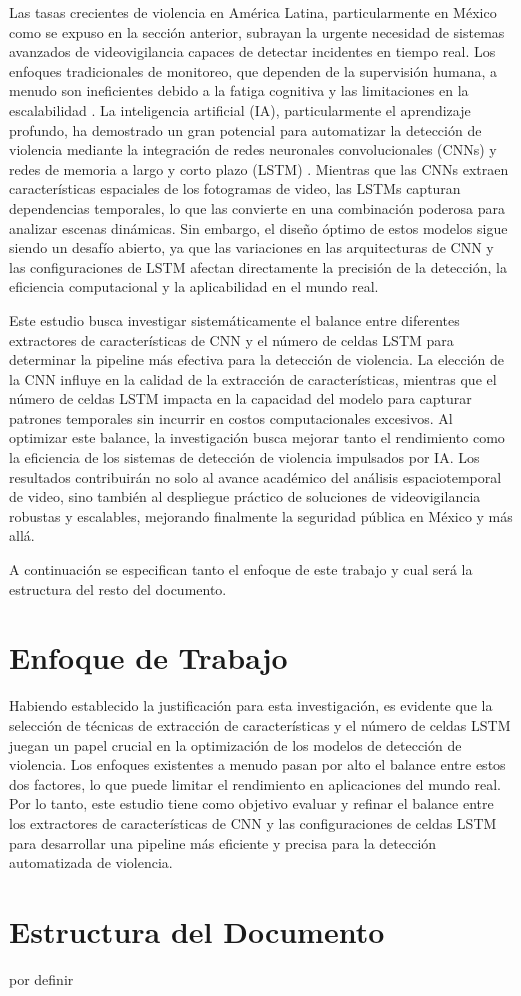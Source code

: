 Las tasas crecientes de violencia en América Latina, 
particularmente en México como se expuso en la sección anterior, 
subrayan la urgente necesidad de sistemas avanzados de 
videovigilancia capaces de detectar incidentes en tiempo real. 
Los enfoques tradicionales de monitoreo, que dependen de la supervisión 
humana, a menudo son ineficientes debido a la fatiga cognitiva y 
las limitaciones en la escalabilidad \cite{Marois2021}. La inteligencia 
artificial (IA), particularmente el aprendizaje profundo, ha demostrado 
un gran potencial para automatizar la detección de violencia mediante 
la integración de redes neuronales convolucionales (CNNs) y redes de 
memoria a largo y corto plazo (LSTM) \cite{Negre2024,Negre20242,Abdali2019,Sharma2021}. 
Mientras que las CNNs extraen características espaciales de los 
fotogramas de video, las LSTMs capturan dependencias temporales, 
lo que las convierte en una combinación poderosa para analizar 
escenas dinámicas. Sin embargo, el diseño óptimo de estos modelos 
sigue siendo un desafío abierto, ya que las variaciones en las 
arquitecturas de CNN y las configuraciones de LSTM afectan directamente 
la precisión de la detección, la eficiencia computacional y la aplicabilidad 
en el mundo real.

Este estudio busca investigar sistemáticamente el balance 
entre diferentes extractores de características de CNN y el número 
de celdas LSTM para determinar la pipeline más efectiva para la 
detección de violencia. La elección de la CNN influye en la calidad 
de la extracción de características, mientras que el número de celdas 
LSTM impacta en la capacidad del modelo para capturar patrones temporales 
sin incurrir en costos computacionales excesivos. Al optimizar este 
balance, la investigación busca mejorar tanto el rendimiento como 
la eficiencia de los sistemas de detección de violencia impulsados por IA. 
Los resultados contribuirán no solo al avance académico del análisis 
espaciotemporal de video, sino también al despliegue práctico de soluciones 
de videovigilancia robustas y escalables, mejorando finalmente la seguridad 
pública en México y más allá.

A continuación se especifican tanto el enfoque de este 
trabajo y cual será la estructura del resto del 
documento.

\section{Enfoque de Trabajo}

Habiendo establecido la justificación para esta investigación, 
es evidente que la selección de técnicas de extracción de 
características y el número de celdas LSTM juegan un papel crucial 
en la optimización de los modelos de detección de violencia. Los enfoques 
existentes a menudo pasan por alto el balance entre estos dos factores, 
lo que puede limitar el rendimiento en aplicaciones del mundo real. 
Por lo tanto, este estudio tiene como objetivo evaluar y refinar 
el balance entre los extractores de características de CNN y las 
configuraciones de celdas LSTM para desarrollar una pipeline más 
eficiente y precisa para la detección automatizada de violencia.

\section{Estructura del Documento}

por definir
